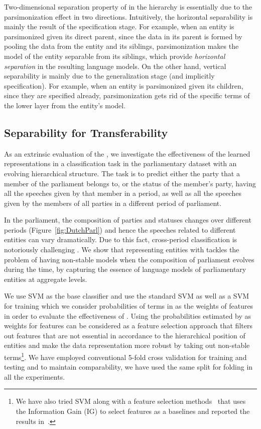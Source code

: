 Two-dimensional separation property of \achswlm in the hierarchy is essentially due to the parsimonization effect in two directions. 
Intuitively, the horizontal separability is mainly the result of the specification stage. For example, when an entity is parsimonized given its direct parent, since the data in its parent is formed by pooling the data from the entity and its siblings, parsimonization makes the model of the entity separable from its siblings, which provide \emph{horizontal separation} in the resulting language models. On the other hand, vertical separability is mainly due to the generalization stage (and implicitly specification). For example, when an entity is parsimonized given its children, since they are specified already, parsimonization gets rid of the specific terms of the lower layer from the entity's model.


\subsection{Separability for Transferability}
\label{subsec:Separability}
As an extrinsic evaluation of the \hswlms, we investigate the effectiveness of the learned representations in a classification task in the parliamentary dataset with an evolving hierarchical structure. The task is to predict either the party that a member of the parliament belongs to, or the status of the member's party, having all the speeches given by that member in a period,  as well as all the speeches given by the members of all parties in a different period of parliament.

In the parliament, the composition of parties and statuses changes over different periods (Figure~\ref{fig:DutchParl}) and hence the speeches related to different entities can vary dramatically.  Due to this fact, cross-period classification is notoriously challenging \citep{Hirst:2014,yu:2008}.  We show that representing entities with \achswlm tackles the problem of having non-stable models when the composition of parliament evolves during the time, by capturing the essence of language models of parliamentary entities at aggregate levels. 

We use SVM as the base classifier and use the standard SVM as well as a SVM for training which we consider probabilities of terms in \achswlm as the weights of features in order to evaluate the effectiveness of \achswlm. Using the probabilities estimated by \achswlm as weights for features can be considered as a feature selection approach that filters out features that are not essential in accordance to the hierarchical position of entities and make the data representation more robust by taking out non-stable terms\footnote{We have also tried SVM along with a feature selection methods~\citep{Forman:2003,brank:2002} that uses the Information Gain (IG) to select features as a baselines and reported the results in~\citep{Dehghani:2016:ICTIR}.}.
We have employed conventional 5-fold cross validation for training and testing and to maintain comparability, we have used the same split for folding in all the experiments.

